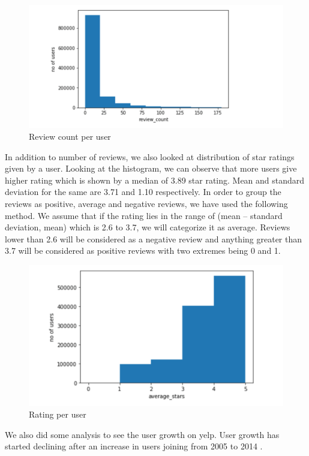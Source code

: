 \documentclass[11pt]{article}
\begin{document}
			\begin{figure}[H]
					\centering
					\includegraphics[scale=0.5]{h_user_review.png}
					\caption{Review count per user}
			\end{figure}
		  In addition to number of reviews, we also looked at distribution of star ratings given by a user. Looking at the histogram, we can observe that more users give higher rating which is shown by a median of 3.89 star rating. Mean and standard deviation for the same are 3.71 and 1.10 respectively. In order to group the reviews as positive, average and negative reviews, we have used the following method. We assume that if the rating lies in the range of (mean – standard deviation, mean) which is 2.6 to 3.7, we will categorize it as average. Reviews lower than 2.6 will be considered as a negative review and anything greater than 3.7 will be considered as positive reviews with two extremes being 0 and 1. 
		 
		  \begin{figure}[H]
		  	\centering
		  	\includegraphics[scale=0.7] {h_user_rating.png}
		  	\caption{Rating per user}
		  \end{figure}
	     We also did some analysis to see the user growth on yelp. User growth has started declining after an increase in users joining from 2005 to 2014 .
	     
\end{document}
